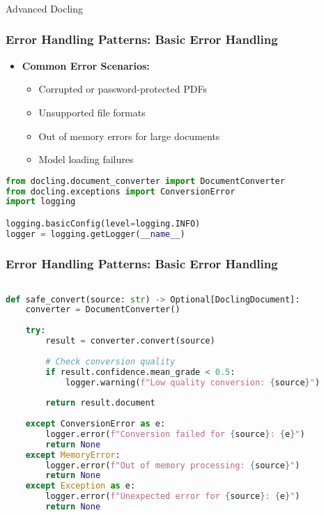 \begin{frame}[fragile]\frametitle{}
\begin{center}
{\Large Advanced Docling}
\end{center}

\end{frame}

\begin{frame}[fragile]\frametitle{Error Handling Patterns: Basic Error Handling}
      \begin{itemize}
        \item \textbf{Common Error Scenarios:}
        \begin{itemize}
            \item Corrupted or password-protected PDFs
            \item Unsupported file formats
            \item Out of memory errors for large documents
            \item Model loading failures
        \end{itemize}
      \end{itemize}

\begin{lstlisting}[language=Python, basicstyle=\tiny]
from docling.document_converter import DocumentConverter
from docling.exceptions import ConversionError
import logging

logging.basicConfig(level=logging.INFO)
logger = logging.getLogger(__name__)

\end{lstlisting}
\end{frame}


\begin{frame}[fragile]\frametitle{Error Handling Patterns: Basic Error Handling}

\begin{lstlisting}[language=Python, basicstyle=\tiny]

def safe_convert(source: str) -> Optional[DoclingDocument]:
    converter = DocumentConverter()
    
    try:
        result = converter.convert(source)
        
        # Check conversion quality
        if result.confidence.mean_grade < 0.5:
            logger.warning(f"Low quality conversion: {source}")
            
        return result.document
        
    except ConversionError as e:
        logger.error(f"Conversion failed for {source}: {e}")
        return None
    except MemoryError:
        logger.error(f"Out of memory processing: {source}")
        return None
    except Exception as e:
        logger.error(f"Unexpected error for {source}: {e}")
        return None
\end{lstlisting}
\end{frame}

